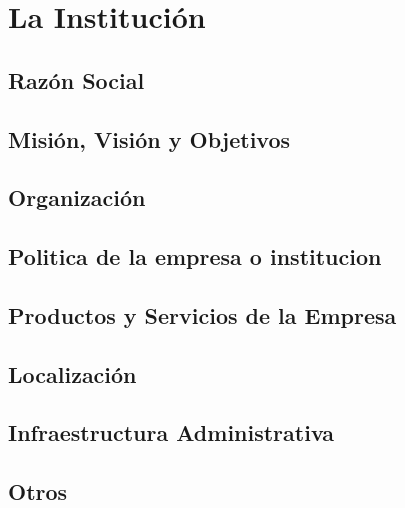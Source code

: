 \chapter{La Institución}

\section{Razón Social}
\section{Misión, Visión y Objetivos}
\section{Organización}
\section{Politica de la empresa o institucion}
\section{Productos y Servicios de la Empresa}
\section{Localización}
\section{Infraestructura Administrativa}
\section{Otros}

